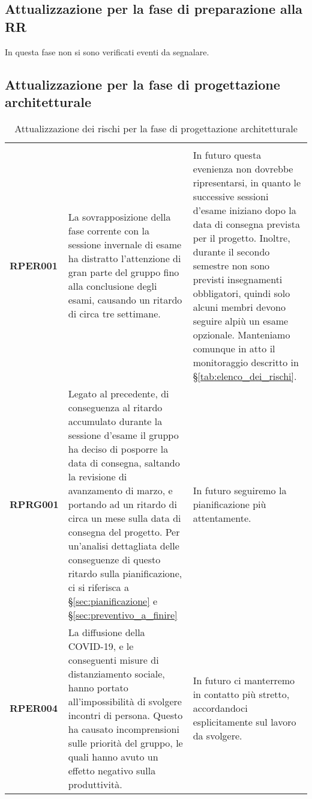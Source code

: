 \documentclass[../piano-di-progetto]{subfiles}
\begin{document}

\subsection{Attualizzazione per la fase di preparazione alla RR}%
\label{sub:attualizzazione_fase_prep_RR}
In questa fase non si sono verificati eventi da segnalare.

\subsection{Attualizzazione per la fase di progettazione architetturale}%
\label{sub:attualizzazione_per_la_fase_di_progettazione_architetturale}

\begin{longtable}[H]{|p{10em}|p{17em}|p{17em}|}
  \caption{Attualizzazione dei rischi per la fase di progettazione architetturale}%
  \label{tab:attualizzazione_per_la_fase_di_progettazione_architetturale} \\
  \rowcolor{darkgray!90!}
  \color{white}{\textbf{Rischio}} & \color{white}{\textbf{Gestione}} & \color{white}{\textbf{Monitoraggio}} \\
  \textbf{RPER001} & La sovrapposizione della fase corrente con la sessione invernale di esame ha distratto l'attenzione di gran parte del gruppo fino alla conclusione degli esami, causando un ritardo di circa tre settimane. & In futuro questa evenienza non dovrebbe ripresentarsi, in quanto le successive sessioni d'esame iniziano dopo la data di consegna prevista per il progetto. Inoltre, durante il secondo semestre non sono previsti insegnamenti obbligatori, quindi solo alcuni membri devono seguire alpiù un esame opzionale. Manteniamo comunque in atto il monitoraggio descritto in §\ref{tab:elenco_dei_rischi}. \\
  \textbf{RPRG001} & Legato al precedente, di conseguenza al ritardo accumulato durante la sessione d'esame il gruppo ha deciso di posporre la data di consegna, saltando la revisione di avanzamento di marzo, e portando ad un ritardo di circa un mese sulla data di consegna del progetto. Per un'analisi dettagliata delle conseguenze di questo ritardo sulla pianificazione, ci si riferisca a §\ref{sec:pianificazione} e §\ref{sec:preventivo_a_finire} & In futuro seguiremo la pianificazione più attentamente. \\
  \textbf{RPER004} & La diffusione della COVID-19, e le conseguenti misure di distanziamento sociale, hanno portato all'impossibilità di svolgere incontri di persona. Questo ha causato incomprensioni sulle priorità del gruppo, le quali hanno avuto un effetto negativo sulla produttività. & In futuro ci manterremo in contatto più stretto, accordandoci esplicitamente sul lavoro da svolgere. \\
\end{longtable}
\end{document}
